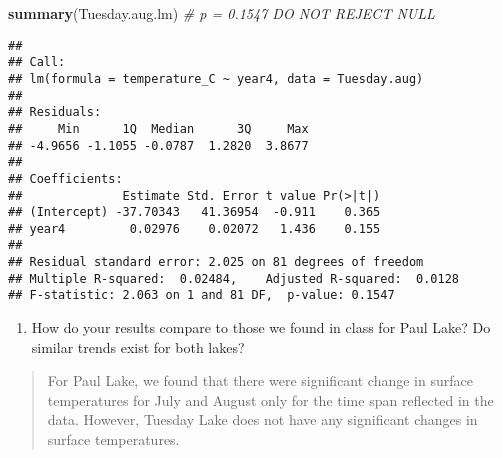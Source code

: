 \documentclass[]{article}
\newenvironment{Shaded}{\begin{snugshade}}{\end{snugshade}}
\newcommand{\CommentTok}[1]{\textcolor[rgb]{0.56,0.35,0.01}{\textit{#1}}}
\newcommand{\KeywordTok}[1]{\textcolor[rgb]{0.13,0.29,0.53}{\textbf{#1}}}
\newcommand{\NormalTok}[1]{#1}
\providecommand{\tightlist}{%
  \setlength{\itemsep}{0pt}\setlength{\parskip}{0pt}}
\begin{document}
\begin{Shaded}
\begin{Highlighting}[]
\KeywordTok{summary}\NormalTok{(Tuesday.aug.lm) }\CommentTok{# p = 0.1547 DO NOT REJECT NULL}
\end{Highlighting}
\end{Shaded}

\begin{verbatim}
## 
## Call:
## lm(formula = temperature_C ~ year4, data = Tuesday.aug)
## 
## Residuals:
##     Min      1Q  Median      3Q     Max 
## -4.9656 -1.1055 -0.0787  1.2820  3.8677 
## 
## Coefficients:
##              Estimate Std. Error t value Pr(>|t|)
## (Intercept) -37.70343   41.36954  -0.911    0.365
## year4         0.02976    0.02072   1.436    0.155
## 
## Residual standard error: 2.025 on 81 degrees of freedom
## Multiple R-squared:  0.02484,    Adjusted R-squared:  0.0128 
## F-statistic: 2.063 on 1 and 81 DF,  p-value: 0.1547
\end{verbatim}

\begin{enumerate}
\def\labelenumi{\arabic{enumi}.}
\setcounter{enumi}{11}
\tightlist
\item
  How do your results compare to those we found in class for Paul Lake?
  Do similar trends exist for both lakes?
\end{enumerate}

\begin{quote}
For Paul Lake, we found that there were significant change in surface
temperatures for July and August only for the time span reflected in the
data. However, Tuesday Lake does not have any significant changes in
surface temperatures.
\end{quote}
\end{document}
